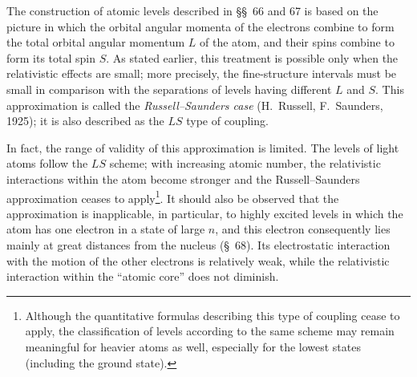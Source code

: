 The construction of atomic levels described in \S\S~66 and 67 is based on the picture in which the orbital angular momenta of the electrons combine to form the total orbital angular momentum $L$ of the atom, and their spins combine to form its total spin $S$. As stated earlier, this treatment is possible only when the relativistic effects are small; more precisely, the fine-structure intervals must be small in comparison with the separations of levels having different $L$ and $S$. This approximation is called the \emph{Russell--Saunders case} (H.~Russell, F.~Saunders, 1925); it is also described as the $LS$ type of coupling.

In fact, the range of validity of this approximation is limited. The levels of light atoms follow the $LS$ scheme; with increasing atomic number, the relativistic interactions within the atom become stronger and the Russell--Saunders approximation ceases to apply\footnote{Although the quantitative formulas describing this type of coupling cease to apply, the classification of levels according to the same scheme may remain meaningful for heavier atoms as well, especially for the lowest states (including the ground state).}. It should also be observed that the approximation is inapplicable, in particular, to highly excited levels in which the atom has one electron in a state of large $n$, and this electron consequently lies mainly at great distances from the nucleus (\S~68). Its electrostatic interaction with the motion of the other electrons is relatively weak, while the relativistic interaction within the ``atomic core'' does not diminish.






